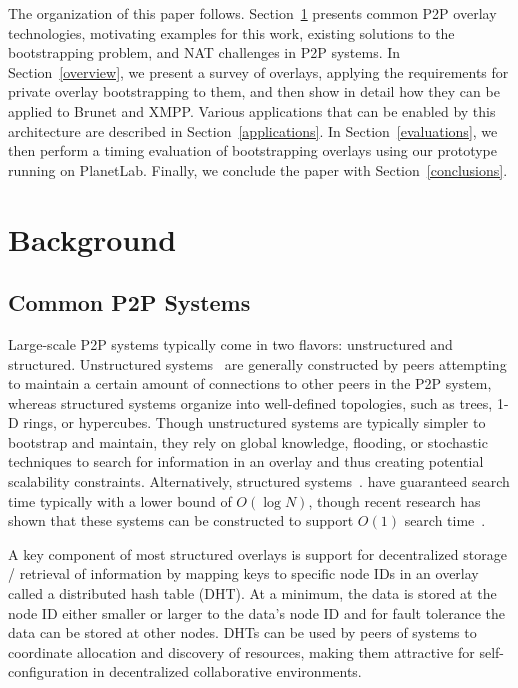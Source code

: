 \documentclass[conference]{IEEEtran}
\begin{document}
The organization of this paper follows.  Section~\ref{background} presents
common P2P overlay technologies, motivating examples for this work, existing
solutions to the bootstrapping problem, and NAT challenges in P2P systems.  In
Section~\ref{overview}, we present a survey of overlays, applying the
requirements for private overlay bootstrapping to them, and then show in detail
how they can be applied to Brunet and XMPP.  Various applications that can be
enabled by this architecture are described in Section~\ref{applications}.  In
Section~\ref{evaluations}, we then perform a timing evaluation of bootstrapping
overlays using our prototype running on PlanetLab.  Finally, we conclude the
paper with Section~\ref{conclusions}.

\section{Background}
\label{background}
\subsection{Common P2P Systems}

Large-scale P2P systems typically come in two flavors:  unstructured and
structured.  Unstructured systems~\cite{gnutella, fasttrack} are generally
constructed by peers attempting to maintain a certain amount of connections to
other peers in the P2P system, whereas structured systems organize into
well-defined topologies, such as trees, 1-D rings, or hypercubes.  Though
unstructured systems are typically simpler to bootstrap and maintain, they rely
on global knowledge, flooding, or stochastic techniques to search for
information in an overlay and thus creating potential scalability constraints.
Alternatively, structured systems~\cite{pastry, chord, symphony, kademlia,
can}.  have guaranteed search time typically with a lower bound of $O(\log N)$,
though recent research has shown that these systems can be constructed to
support $O(1)$ search time~\cite{beehive}.

A key component of most structured overlays is support for decentralized
storage / retrieval of information by mapping keys to specific node IDs in an
overlay called a distributed hash table (DHT).  At a minimum, the data is
stored at the node ID either smaller or larger to the data's node ID and for
fault tolerance the data can be stored at other nodes.  DHTs can be used by
peers of systems to coordinate allocation and discovery of resources, making
them attractive for self-configuration in decentralized collaborative
environments.
\end{document}
